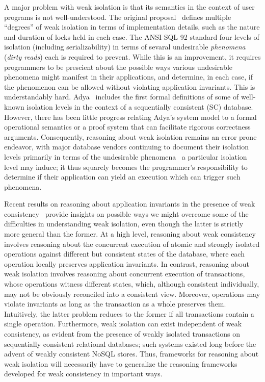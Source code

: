 A major problem with weak isolation is that its semantics in the
context of user programs is not well-understood. The original
proposal~\cite{gray1976} defines multiple ``degrees'' of weak
isolation in terms of implementation details, such as the nature and
duration of locks held in each case. The ANSI SQL 92 standard four
levels of isolation (including serializability) in terms of sevaral
undesirable \emph{phenomena} (\eg \emph{dirty reads}) each is required
to prevent. While this is an improvement, it requires programmers to
be prescient about the possible ways various undesirable phenomena
might manifest in their applications, and determine, in each case, if
the phenomenon can be allowed without violating application
invariants. This is understandably hard. Adya~\cite{adyaphd} includes
the first formal definitions of some of well-known isolation levels in
the context of a sequentially consistent (SC) database.  However,
there has been little progress relating Adya's system model to a
formal operational semantics or a proof system that can facilitate
rigorous correctness arguments.  Consequently, reasoning about weak
isolation remains an error prone endeavor, with major database vendors
continuing to document their isolation levels primarily in terms of
the undesirable phenomena~\cite{postgresiso, mysqliso, oracleiso} a
particular isolation level may induce; it thus squarely becomes the
programmer's responsibility to determine if their application can
yield an execution which can trigger such phenomena.

Recent results on reasoning about application invariants in the
presence of weak consistency~\cite{burckhardt14, redblueosdi,
  redblueatc, ecinec, gotsmanpopl16} provide insights on possible ways
we might overcome some of the difficulties in understanding weak
isolation, even though the latter is strictly more general than the
former.  At a high level, reasoning about weak consistency involves
reasoning about the concurrent execution of atomic and strongly
isolated operations against different but consistent states of the
database, where each operation locally preserves application
invariants. In contrast, reasoning about weak isolation involves
reasoning about concurrent execution of transactions, whose operations
witness different states, which, although consistent individually, may
not be obviously reconciled into a consistent view. Moreover,
operations may violate invariants as long as the transaction as a
whole preserves them.  Intuitively, the latter problem reduces to the
former if all transactions contain a single operation. Furthermore,
weak isolation can exist independent of weak consistency, as evident
from the presence of weakly isolated transactions on sequentially
consistent relational databases; such systems existed long before the
advent of weakly consistent NoSQL stores.  Thus, frameworks for
reasoning about weak isolation will necessarily have to generalize the
reasoning frameworks developed for weak consistency in important ways.

